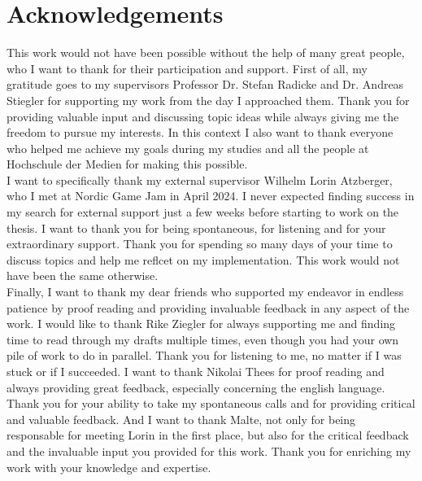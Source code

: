\chapter{Acknowledgements}

This work would not have been possible without the help of many great people, who I want to thank for their 
participation and support. First of all, my gratitude goes to my supervisors Professor Dr. Stefan Radicke 
and Dr. Andreas Stiegler for supporting my work from the day I approached them. Thank you for providing 
valuable input and discussing topic ideas while always giving me the freedom to pursue my interests. In 
this context I also want to thank everyone who helped me achieve my goals during my studies and all the 
people at Hochschule der Medien for making this possible. \\

\noindent
I want to specifically thank my external supervisor Wilhelm Lorin Atzberger, who I met at Nordic Game Jam 
in April 2024. I never expected finding success in my search for external support just a few weeks before 
starting to work on the thesis. I want to thank you for being spontaneous, for listening and for your 
extraordinary support. Thank you for spending so many days of your time to discuss topics and help me 
reflcet on my implementation. This work would not have been the same otherwise. \\

\noindent
Finally, I want to thank my dear friends who supported my endeavor in endless patience by proof reading and 
providing invaluable feedback in any aspect of the work. I would like to thank Rike Ziegler for always 
supporting me and finding time to read through my drafts multiple times, even though you had your own 
pile of work to do in parallel. Thank you for listening to me, no matter if I was stuck or if I succeeded. 
I want to thank Nikolai Thees for proof reading and always providing great feedback, especially concerning 
the english language. Thank you for your ability to take my spontaneous calls and for providing critical and 
valuable feedback. And I want to thank Malte, not only for being responsable for meeting Lorin in the 
first place, but also for the critical feedback and the invaluable input you provided for this work. Thank 
you for enriching my work with your knowledge and expertise. \\
